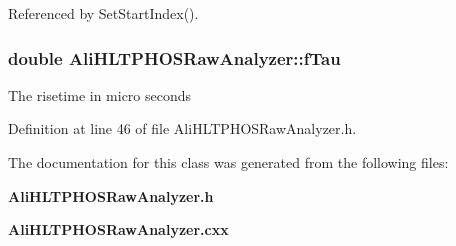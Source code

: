Referenced by Set\-Start\-Index().
\subsubsection{\setlength{\rightskip}{0pt plus 5cm}double {\bf Ali\-HLTPHOSRaw\-Analyzer::f\-Tau}\hspace{0.3cm}{\tt  [protected]}}\label{classAliHLTPHOSRawAnalyzer_p4}


The risetime in micro seconds 

Definition at line 46 of file Ali\-HLTPHOSRaw\-Analyzer.h.

The documentation for this class was generated from the following files:\begin{CompactItemize}
\item 
{\bf Ali\-HLTPHOSRaw\-Analyzer.h}\item 
{\bf Ali\-HLTPHOSRaw\-Analyzer.cxx}\end{CompactItemize}
